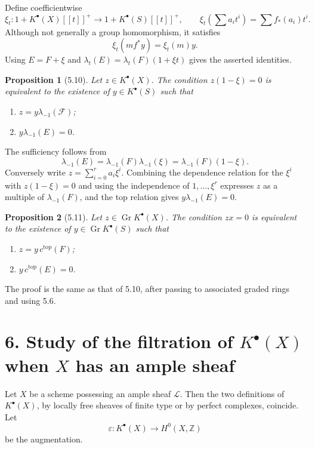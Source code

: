 \documentclass[13pt]{extarticle}
\newcommand{\ZZ}{\mathbb Z}
\newcommand{\Gr}{\operatorname{Gr}}
\newtheorem*{proposition}{Proposition}
\begin{document}
Define coefficientwise
\[
\xi_t:1+K^{\bullet}(X)[[t]]^+\to 1+K^{\bullet}(S)[[t]]^+,
\qquad
\xi_t\left(\sum a_it^i\right)=\sum f_*(a_i)t^i.
\]
Although not generally a group homomorphism, it satisfies
\[
\xi_t(mf^*y)=\xi_t(m)y.
\]
Using $E=F+\xi$ and $\lambda_t(E)=\lambda_t(F)(1+
\xi t)$ gives the asserted identities.

\begin{proposition}[5.10]
Let $z\in K^{\bullet}(X)$. The condition $z(1-\xi)=0$ is equivalent to the existence of $y\in K^{\bullet}(S)$ such that
\begin{enumerate}[label=(\roman*)]
\item $z=y\lambda_{-1}(\mathcal F)$;
\item $y\lambda_{-1}(E)=0$.
\end{enumerate}
\end{proposition}

The sufficiency follows from
\[
\lambda_{-1}(E)=\lambda_{-1}(F)\lambda_{-1}(\xi)=\lambda_{-1}(F)(1-\xi).
\]
Conversely write $z=\sum_{i=0}^{r}a_i\xi^i$. Combining the dependence relation for the $\xi^i$ with $z(1-\xi)=0$ and using the independence of $1,\ldots,\xi^r$ expresses $z$ as a multiple of $\lambda_{-1}(F)$, and the top relation gives $y\lambda_{-1}(E)=0$.

\begin{proposition}[5.11]
Let $z\in\Gr K^{\bullet}(X)$. The condition $zx=0$ is equivalent to the existence of $y\in\Gr K^{\bullet}(S)$ such that
\begin{enumerate}[label=(\roman*)]
\item $z=y\,c^{\mathrm{top}}(F)$;
\item $y\,c^{\mathrm{top}}(E)=0$.
\end{enumerate}
\end{proposition}
The proof is the same as that of 5.10, after passing to associated graded rings and using 5.6.

\section*{6. Study of the filtration of $K^{\bullet}(X)$ when $X$ has an ample sheaf}

Let $X$ be a scheme possessing an ample sheaf $\mathcal L$. Then the two definitions of $K^{\bullet}(X)$, by locally free sheaves of finite type or by perfect complexes, coincide. Let
\[
\varepsilon:K^{\bullet}(X)\to H^0(X,\ZZ)
\]
be the augmentation.
\end{document}
